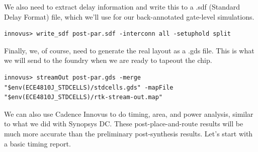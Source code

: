 \documentclass[a4paper,12pt,twoside]{article}
\begin{document}
We also need to extract delay information and write this to a .sdf (Standard Delay Format) file, which we’ll use for our back-annotated gate-level simulations.
\begin{verbatim}
innovus> write_sdf post-par.sdf -interconn all -setuphold split
\end{verbatim}
Finally, we, of course, need to generate the real layout as a .gds file. This is what we will send to the foundry when we are ready to tapeout the chip.
\begin{verbatim}
innovus> streamOut post-par.gds -merge "$env(ECE4810J_STDCELLS)/stdcells.gds" -mapFile "$env(ECE4810J_STDCELLS)/rtk-stream-out.map"
\end{verbatim}
We can also use Cadence Innovus to do timing, area, and power analysis, similar to what we did with Synopsys DC. These post-place-and-route results will be much more accurate than the preliminary post-synthesis results. Let’s start with a basic timing report.
\end{document}
